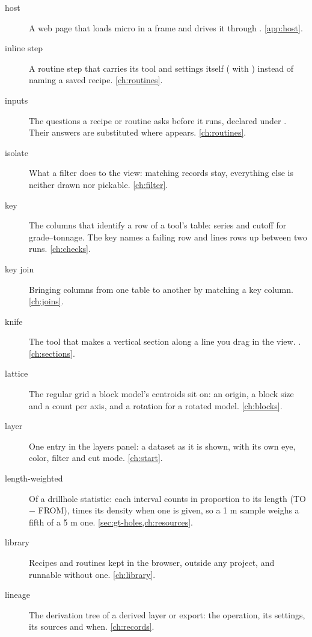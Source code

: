 \begin{description}
\item[host] A web page that loads micro in a frame and drives it through .
  \cref{app:host}.

\item[inline step] A routine step that carries its tool and settings itself ( with
  ) instead of naming a saved recipe. \cref{ch:routines}.

\item[inputs] The questions a recipe or routine asks before it runs, declared under
  . Their answers are substituted where  appears. \cref{ch:routines}.

\item[isolate] What a filter does to the view: matching records stay, everything else is neither
  drawn nor pickable. \cref{ch:filter}.

\item[key] The columns that identify a row of a tool's table: series and cutoff for
  grade–tonnage. The key names a failing row and lines rows up between two runs. \cref{ch:checks}.

\item[key join] Bringing columns from one table to another by matching a key column.
  \cref{ch:joins}.

\item[knife] The tool that makes a vertical section along a line you drag in the view. .
  \cref{ch:sections}.

\item[lattice] The regular grid a block model's centroids sit on: an origin, a block size and a
  count per axis, and a rotation for a rotated model. \cref{ch:blocks}.

\item[layer] One entry in the layers panel: a dataset as it is shown, with its own eye, color,
  filter and cut mode. \cref{ch:start}.

\item[length-weighted] Of a drillhole statistic: each interval counts in proportion to its length
  (TO − FROM), times its density when one is given, so a 1 m sample weighs a fifth of a 5 m one.
  \cref{sec:gt-holes,ch:resources}.

\item[library] Recipes and routines kept in the browser, outside any project, and runnable without
  one. \cref{ch:library}.

\item[lineage] The derivation tree of a derived layer or export: the operation, its settings, its
  sources and when. \cref{ch:records}.


\end{description}
